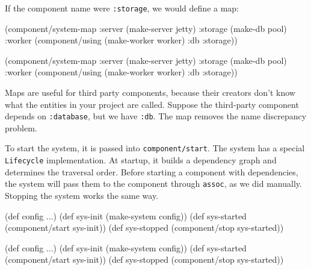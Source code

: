 \fi


\noindent
If the component name were \verb|:storage|, we would define a map:

\ifnarrow

\begin{english}
  \begin{clojure}
(component/system-map
 :server  (make-server jetty)
 :storage (make-db pool)
 :worker  (component/using
            (make-worker worker)
            {:db :storage}))
  \end{clojure}
\end{english}

\else

\begin{english}
  \begin{clojure}
(component/system-map
 :server  (make-server jetty)
 :storage (make-db pool)
 :worker  (component/using
           (make-worker worker) {:db :storage}))
  \end{clojure}
\end{english}

\fi

Maps are useful for third party components, because their creators don't know what the entities in your project are called. Suppose the third-party component depends on \verb|:database|, but we have \verb|:db|. The map removes the name discrepancy problem.

To start the system, it is passed into \verb|component/start|. The system has a special \verb|Lifecycle| implementation. At startup, it builds a dependency graph and determines the traversal order. Before starting a component with dependencies, the system will pass them to the component through \verb|assoc|, as we did manually. Stopping the system works the same way.

\ifnarrow

\begin{english}
  \begin{clojure}
(def config {...})
(def sys-init (make-system config))
(def sys-started
  (component/start sys-init))
(def sys-stopped
  (component/stop sys-started))
  \end{clojure}
\end{english}

\else

\begin{english}
  \begin{clojure}
(def config {...})
(def sys-init (make-system config))
(def sys-started (component/start sys-init))
(def sys-stopped (component/stop sys-started))
  \end{clojure}
\end{english}


